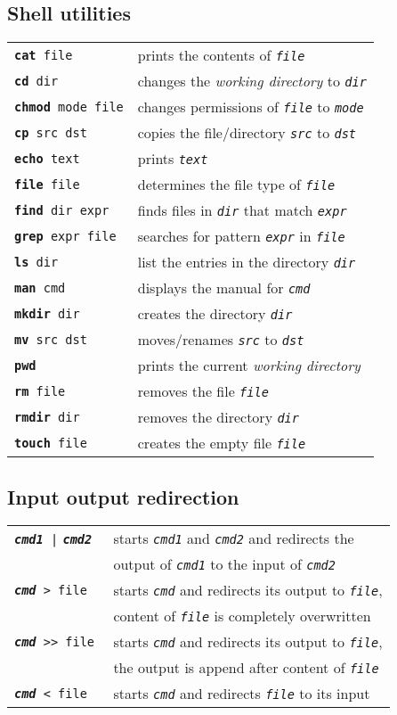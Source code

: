 \documentclass[landscape, a4paper]{article}
\newcommand{\cv}[1]{\textit{\texttt{#1}}}
\newcommand{\shcmd}[2]{\texttt{\textbf{#1} #2}}
\begin{document}
\begin{multicols*}{3}
\subsection*{Shell utilities}
\begin{tabular}{ll}
\shcmd{cat}{file} 				& prints the contents of \cv{file}\\
\shcmd{cd}{dir} 				& changes the \textit{working directory} to \cv{dir}\\
\shcmd{chmod}{mode file} 	    & changes permissions of \cv{file} to \cv{mode}\\
\shcmd{cp}{src dst} 		    & copies the file/directory \cv{src} to \cv{dst}\\
\shcmd{echo}{text} 			    & prints \cv{text}\\
\shcmd{file}{file} 			    & determines the file type of \cv{file}\\
\shcmd{find}{dir expr} 	        & finds files in \cv{dir} that match \cv{expr}\\
\shcmd{grep}{expr file} 	    & searches for pattern \cv{expr} in \cv{file}\\
\shcmd{ls}{dir} 				& list the entries in the directory \cv{dir}\\
\shcmd{man}{cmd} 				& displays the manual for \cv{cmd}\\
\shcmd{mkdir}{dir} 			    & creates the directory \cv{dir}\\
\shcmd{mv}{src dst} 		    & moves/renames \cv{src} to \cv{dst}\\
\shcmd{pwd}{} 					& prints the current \textit{working directory}\\
\shcmd{rm}{file} 				& removes the file \cv{file}\\
\shcmd{rmdir}{dir} 			    & removes the directory \cv{dir}\\
\shcmd{touch}{file} 			& creates the empty file \cv{file}
\end{tabular}
\subsection*{Input output redirection}
\begin{tabular}{ll}
\shcmd{\cv{cmd1}}{|} \shcmd{\cv{cmd2}}{} & starts \cv{cmd1} and \cv{cmd2} and redirects the\\
		        			  	& output of \cv{cmd1} to the input of \cv{cmd2}\\
\shcmd{\cv{cmd}}{> file} 	    & starts \cv{cmd} and redirects its output to \cv{file},\\
	        		       		& content of \cv{file} is completely overwritten\\
\shcmd{\cv{cmd}}{>\null> file} 	& starts \cv{cmd} and redirects its output to \cv{file},\\
        			    		& the output is append after content of \cv{file}\\
\shcmd{\cv{cmd}}{< file}	    & starts \cv{cmd} and redirects \cv{file} to its input
					  

\end{tabular}
\end{multicols*}
\end{document}
